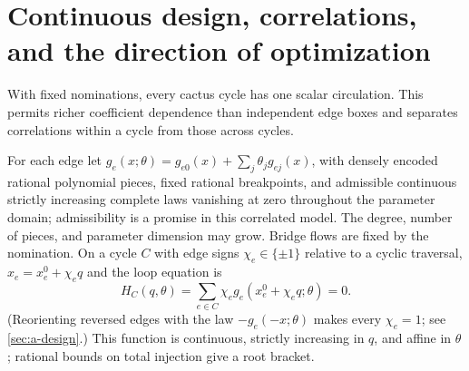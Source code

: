 \section{Continuous design, correlations, and the direction of optimization}
\label{sec:main-design}

With fixed nominations, every cactus cycle has one scalar circulation.
This permits richer coefficient dependence than independent edge boxes
and separates correlations within a cycle from those across cycles.

For each edge let
$g_e(x;\theta)=g_{e0}(x)+\sum_j\theta_jg_{ej}(x)$,
with densely encoded rational polynomial pieces, fixed rational
breakpoints, and admissible continuous strictly increasing complete
laws vanishing at zero throughout the parameter domain; admissibility
is a promise in this correlated model. The degree, number of pieces,
and parameter dimension may grow. Bridge flows are fixed by the
nomination. On a cycle $C$ with edge signs $\chi_e\in\{\pm1\}$
relative to a cyclic traversal, $x_e=x_e^0+\chi_eq$ and the loop
equation is
\[
 H_C(q,\theta)=\sum_{e\in C}\chi_eg_e(x_e^0+\chi_eq;\theta)=0.
\]
(Reorienting reversed edges with the law $-g_e(-x;\theta)$ makes every
$\chi_e=1$; see \cref{sec:a-design}.) This function is continuous,
strictly increasing in $q$, and affine in $\theta$; rational bounds on
total injection give a root bracket.

